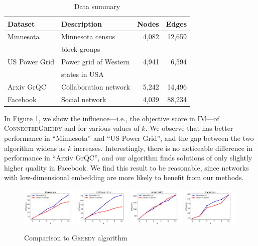 \label{sec:compare-to-greedy}
\begin{table}[ht]
\centering \caption{Data summary}
\label{table:datasets}
\vspace{-.15in}
\begin{tabular}{|l|l|r|r|}
\hline
\textbf{Dataset}  & \textbf{Description} & \textbf{Nodes} & \textbf{Edges} \\
\hline
Minnesota  & Minnesota census & 4,082 & 12,659 \\
& block groups & & \\
\hline
US Power Grid & Power grid of Western  & 4,941 & 6,594\\
& states in USA & & \\
\hline
Arxiv GrQC & Collaboration network & 5,242 & 14,496 \\
\hline
Facebook  & Social network & 4,039 & 88,234\\
\hline
\end{tabular}
\end{table}

In Figure \ref{fig:compare-greedy}, we show the influence---i.e., the objective score in IM---of \textsc{ConnectedGreedy} and \algomaxcrit{} for various values of $k$. We observe that \algomaxcrit{} has better performance in ``Minnesota'' and ``US Power Grid'', and the gap between the two algorithm widens as $k$ increases. Interestingly, there is no noticeable difference in performance in ``Arxiv GrQC'', and our algorithm finds solutions of only slightly higher quality in Facebook. We find this result to be reasonable, since networks with low-dimensional embedding are more likely to benefit from our methods.

\begin{figure}
\centering
\includegraphics[width=0.24\textwidth]{img/baseline-mn-blkgrp.pdf}
\includegraphics[width=0.24\textwidth]{img/baseline-USpowergrid.pdf}
\includegraphics[width=0.24\textwidth]{img/baseline-ca-GrQC.pdf}
\includegraphics[width=0.24\textwidth]{img/baseline-facebook.pdf}\\
\caption{Comparison to \textsc{Greedy} algorithm}
\label{fig:compare-greedy}
\end{figure}


